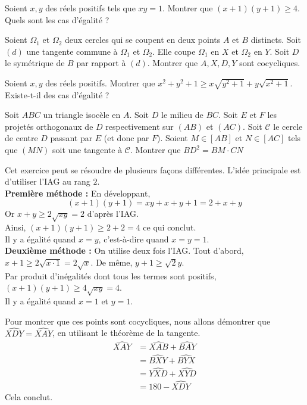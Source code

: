 \begin{exo}
Soient $x, y$ des réels positifs tels que $xy=1$. Montrer que $(x+1)(y+1) \geq 4$. Quels sont les cas d'égalité ?
\end{exo}


\begin{exo}
Soient $\Omega_1$ et $\Omega_2$ deux cercles qui se coupent en deux points $A$ et $B$ distincts. Soit $(d)$ une tangente commune à $\Omega_1$ et $\Omega_2$. Elle coupe $\Omega_1$ en $X$ et $\Omega_2$ en $Y$. Soit $D$ le symétrique de $B$ par rapport à $(d)$. Montrer que $A, X, D, Y$ sont cocycliques. 
\end{exo}


\begin{exo}
Soient $x, y$ des réels positifs. Montrer que $x^2+y^2+1 \geq x\sqrt{y^2+1} + y\sqrt{x^2+1}$. Existe-t-il des cas d'égalité ?
\end{exo}


\begin{exo}
Soit $ABC$ un triangle isocèle en $A$. Soit $D$ le milieu de $BC$. Soit $E$ et $F$ les projetés orthogonaux de $D$ respectivement sur $(AB)$ et $(AC)$. Soit $\mathcal{C}$ le cercle de centre $D$ passant par $E$ (et donc par $F$). Soient $M \in [AB]$ et $N \in [AC]$ tels que $(MN)$ soit une tangente à $\mathcal{C}$. Montrer que $BD^2= BM \cdot CN$
\end{exo}


\begin{sol}
Cet exercice peut se résoudre de plusieurs façons différentes. L'idée principale est d'utiliser l'IAG au rang $2$. \\
\textbf{Première méthode :} En développant,
$$(x + 1)(y + 1) = xy + x + y + 1 = 2 + x + y$$
Or $x+ y  \geq 2\sqrt{xy} = 2$ d'après l'IAG. \\
Ainsi, $(x + 1)(y + 1) \geq 2 + 2 = 4$ ce qui conclut. \\
Il y a égalité quand $x = y$, c'est-à-dire quand $x = y = 1$. \\
\textbf{Deuxième méthode :} On utilise deux fois l'IAG. Tout d'abord, $x + 1 \geq 2 \sqrt{x \cdot 1} = 2 \sqrt{x}$. De même, $y+1 \geq \sqrt 2{y}$. \\
Par produit d'inégalités dont tous les termes sont positifs, $(x+1)(y+1) \geq 4\sqrt{xy} = 4$. \\
Il y a égalité quand $x = 1$ et $y = 1$.
\end{sol}


\begin{sol}
Pour montrer que ces points sont cocycliques, nous allons démontrer que $\widehat{XDY} = \widehat{XAY}$, en utilisant le théorème de la tangente. 
\begin{align*} 
\widehat{XAY} &= \widehat{XAB}+ \widehat{BAY} \\
& = \widehat{BXY} + \widehat{BYX} \\
& = \widehat{YXD} + \widehat{XYD} \\
& = 180 - \widehat{XDY}
\end{align*}
Cela conclut.
\end{sol}

